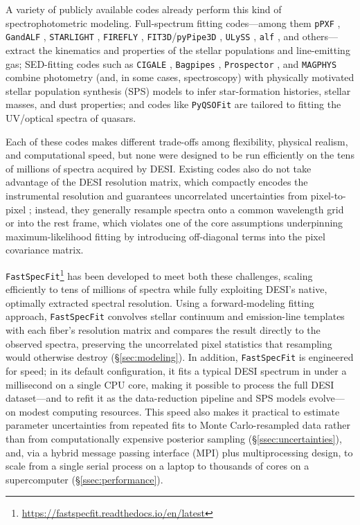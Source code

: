 \documentclass[modern,linenumbers]{aastex701}
\newcommand{\fastspecfit}{\texttt{FastSpecFit}}
\begin{document}
A variety of publicly available codes already perform this kind of
spectrophotometric modeling. Full-spectrum fitting codes---among them
\texttt{pPXF} \citep{cappellari04a, cappellari23a}, \texttt{GandALF}
\citep{sarzi06a, sarzi17a}, \texttt{STARLIGHT}
\citep{cid-fernandes05a}, \texttt{FIREFLY} \citep{wilkinson17a},
\texttt{FIT3D}/\texttt{pyPipe3D} \citep{sanchez16a, sanchez22a},
\texttt{ULySS} \citep{koleva09a}, \texttt{alf} \citep{conroy18a}, and
others---extract the kinematics and properties of the stellar
populations and line-emitting gas; SED-fitting codes such as
\texttt{CIGALE} \citep{boquien19a}, \texttt{Bagpipes}
\citep{carnall18a}, \texttt{Prospector} \citep{johnson21a}, and
\texttt{MAGPHYS} \citep{da-cunha08a} combine photometry (and, in some
cases, spectroscopy) with physically motivated stellar population
synthesis (SPS) models to infer star-formation histories, stellar
masses, and dust properties; and codes like \texttt{PyQSOFit}
\citep{guo18a} are tailored to fitting the UV/optical spectra of
quasars.

Each of these codes makes different trade-offs among flexibility,
physical realism, and computational speed, but none were designed to
be run efficiently on the tens of millions of spectra acquired by
DESI. Existing codes also do not take advantage of the DESI resolution
matrix, which compactly encodes the instrumental resolution and
guarantees uncorrelated uncertainties from pixel-to-pixel
\citep{bolton10a, guy23a}; instead, they generally resample spectra
onto a common wavelength grid or into the rest frame, which violates
one of the core assumptions underpinning maximum-likelihood fitting by
introducing off-diagonal terms into the pixel covariance matrix.

\fastspecfit\footnote{\url{https://fastspecfit.readthedocs.io/en/latest}}
has been developed to meet both these challenges, scaling efficiently
to tens of millions of spectra while fully exploiting DESI's native,
optimally extracted spectral resolution. Using a forward-modeling
fitting approach, \fastspecfit{} convolves stellar continuum and
emission-line templates with each fiber's resolution matrix and
compares the result directly to the observed spectra, preserving the
uncorrelated pixel statistics that resampling would otherwise destroy
(\S\ref{sec:modeling}). In addition, \fastspecfit{} is engineered for
speed; in its default configuration, it fits a typical DESI spectrum
in under a millisecond on a single CPU core, making it possible to
process the full DESI dataset---and to refit it as the data-reduction
pipeline and SPS models evolve---on modest computing resources. This
speed also makes it practical to estimate parameter uncertainties from
repeated fits to Monte Carlo-resampled data rather than from
computationally expensive posterior sampling
(\S\ref{ssec:uncertainties}), and, via a hybrid message passing
interface (MPI) plus multiprocessing design, to scale from a single
serial process on a laptop to thousands of cores on a supercomputer
(\S\ref{ssec:performance}).
\end{document}
